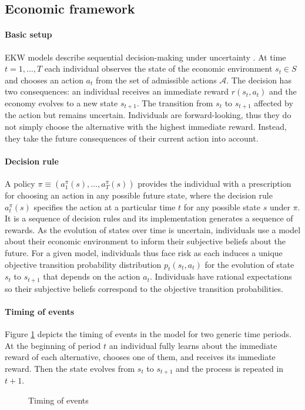 \subsection{Economic framework}
\paragraph{Basic setup} EKW models describe sequential decision-making under uncertainty \citep{Gilboa.2009, Machina.2014}. At time $t = 1, \hdots, T$ each individual observes the state of the economic environment $s_t\in S$ and chooses an action $a_t$ from the set of admissible actions $\mathcal{A}$. The decision has two consequences: an individual receives an immediate reward $r(s_t, a_t)$ and the economy evolves to a new state $s_{t + 1}$. The transition from $s_t$ to $s_{t + 1}$ affected by the action but remains uncertain. Individuals are forward-looking, thus they do not simply choose the alternative with the highest immediate reward. Instead, they take the future consequences of their current action into account.

\paragraph{Decision rule} A policy $\pi \equiv(a^\pi_1(s), \hdots, a^\pi_T(s))$ provides the individual with a prescription for choosing an action in any possible future state, where the decision rule $a^\pi_t(s)$ specifies the action at a particular time $t$ for any possible state $s$ under $\pi$. It is a sequence of decision rules and its implementation generates a sequence of rewards.  As the evolution of states over time is uncertain, individuals use a model about their economic environment to inform their subjective beliefs about the future. For a given model, individuals thus face risk as each induces a unique objective transition probability distribution $p_t(s_t, a_t)$ for the evolution of state $s_t$ to $s_{t + 1}$ that depends on the action $a_t$. Individuals have rational expectations \citep{Lucas.1972, Muth.1961} so their subjective beliefs correspond to the objective transition probabilities.

\paragraph{Timing of events} Figure \ref{Timing} depicts the timing of events in the model for two generic time periods. At the beginning of period $t$ an individual fully learns about the immediate reward of each alternative, chooses one of them, and receives its immediate reward. Then the state evolves from $s_t$ to $s_{t + 1}$ and the process is repeated in $t + 1$.
%
\begin{figure}\caption{Timing of events}\label{Timing}\vspace{1.0cm}\centering

\end{figure}
%
